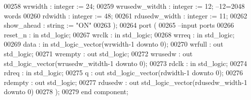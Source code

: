 \begin{DoxyCode}
00258         wrwidth             : \textcolor{comment}{integer} := \textcolor{vhdllogic}{}\textcolor{vhdllogic}{24};
00259         wrusedw_witdth      : \textcolor{comment}{integer} := \textcolor{vhdllogic}{}\textcolor{vhdllogic}{12}; \textcolor{keyword}{--12=2048 words }
00260         rdwidth             : \textcolor{comment}{integer} := \textcolor{vhdllogic}{}\textcolor{vhdllogic}{48};
00261         rdusedw_width       : \textcolor{comment}{integer} := \textcolor{vhdllogic}{}\textcolor{vhdllogic}{11};
00262         show_ahead          : \textcolor{comment}{string}  := \textcolor{keyword}{"ON"}
00263   );  
00264   \textcolor{keywordflow}{port} (
00265 \textcolor{keyword}{      --input ports }
00266       reset_n               : \textcolor{keywordflow}{in} \textcolor{comment}{std\_logic};
00267       wrclk                 : \textcolor{keywordflow}{in} \textcolor{comment}{std\_logic};
00268       wrreq                 : \textcolor{keywordflow}{in} \textcolor{comment}{std\_logic};
00269       data                  : \textcolor{keywordflow}{in} \textcolor{comment}{std\_logic\_vector}(wrwidth\textcolor{vhdlchar}{-}\textcolor{vhdllogic}{}\textcolor{vhdllogic}{1} \textcolor{keywordflow}{downto} \textcolor{vhdllogic}{}\textcolor{vhdllogic}{0});
00270       wrfull                : \textcolor{keywordflow}{out} \textcolor{comment}{std\_logic};
00271         wrempty             : \textcolor{keywordflow}{out} \textcolor{comment}{std\_logic};
00272       wrusedw               : \textcolor{keywordflow}{out} \textcolor{comment}{std\_logic\_vector}(wrusedw_witdth\textcolor{vhdlchar}{-}\textcolor{vhdllogic}{}\textcolor{vhdllogic}{1} \textcolor{keywordflow}{downto} \textcolor{vhdllogic}{}\textcolor{vhdllogic}{0});
00273       rdclk                 : \textcolor{keywordflow}{in} \textcolor{comment}{std\_logic};
00274       rdreq                 : \textcolor{keywordflow}{in} \textcolor{comment}{std\_logic};
00275       q                     : \textcolor{keywordflow}{out} \textcolor{comment}{std\_logic\_vector}(rdwidth\textcolor{vhdlchar}{-}\textcolor{vhdllogic}{}\textcolor{vhdllogic}{1} \textcolor{keywordflow}{downto} \textcolor{vhdllogic}{}\textcolor{vhdllogic}{0});
00276       rdempty               : \textcolor{keywordflow}{out} \textcolor{comment}{std\_logic};
00277       rdusedw               : \textcolor{keywordflow}{out} \textcolor{comment}{std\_logic\_vector}(rdusedw_width\textcolor{vhdlchar}{-}\textcolor{vhdllogic}{}\textcolor{vhdllogic}{1} \textcolor{keywordflow}{downto} \textcolor{vhdllogic}{}\textcolor{vhdllogic}{0})     
00278         );
00279 \textcolor{keywordflow}{end} \textcolor{keywordflow}{component};

\end{DoxyCode}
